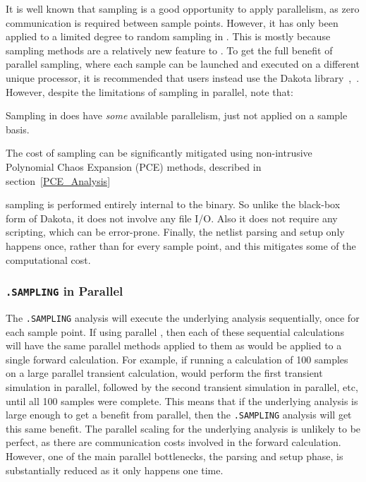 It is well known that sampling is a good opportunity to apply parallelism, as zero communication is required between sample points.
However, it has only been applied to a limited degree to random sampling in \Xyce{}.  
This is mostly because sampling methods 
are a relatively new feature to \Xyce{}. To get the full benefit of parallel sampling, where each 
sample can be launched and executed on a different unique processor, it is
recommended that \Xyce{} users instead use the Dakota library~\cite{DakotaTheoMan},~\cite{DakotaUsersMan}.
However, despite the limitations of \Xyce{} sampling in parallel, note that:
\begin{XyceItemize}
\item Sampling in \Xyce{} does have \emph{some} available parallelism, just not applied on a sample basis.
\item The cost of sampling can be significantly mitigated using non-intrusive Polynomial Chaos 
  Expansion (PCE) methods, described in section~\ref{PCE_Analysis}
\item \Xyce{} sampling is performed entirely internal to the \Xyce{} binary.  So unlike the black-box form of Dakota, it does not involve any file I/O. Also it does not require any scripting, which can be error-prone.    Finally, the netlist parsing and setup only happens once, rather than for every sample point, and this mitigates some of the computational cost.
\end{XyceItemize}

\subsubsection{\texttt{.SAMPLING} in Parallel}
The \texttt{.SAMPLING} analysis will execute the underlying analysis sequentially, once 
for each sample point.    If using parallel \Xyce{}, then each of these sequential 
calculations will have the same parallel methods applied to them as would be 
applied to a single forward calculation.    For example, if running a calculation
of 100 samples on a large parallel transient calculation, \Xyce{} would perform 
the first transient simulation in parallel, followed by the second transient 
simulation in parallel, etc, until all 100 samples were complete.
This means that if the underlying analysis is 
large enough to get a benefit from parallel, then the \texttt{.SAMPLING} 
analysis will get this same benefit.  The parallel scaling for the underlying 
analysis is unlikely to be perfect, as there are communication costs involved 
in the forward calculation.  However, one of the main parallel bottlenecks, 
the parsing and setup phase, is substantially reduced as it only happens one time.


